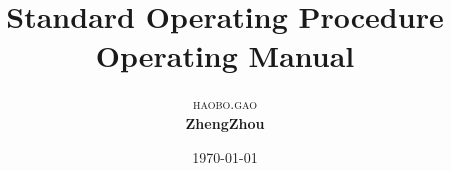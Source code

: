 \documentclass [a4paper,8pt,oneside] {report}
\begin{document}
\title{\textbf{Standard Operating Procedure}\\ %
Operating Manual} %

\author{\textsc{haobo.gao} %
\\{\textbf{ZhengZhou}}
} %

\date{\today} %
\maketitle


\tableofcontents
\newpage
{}

\end{document}

